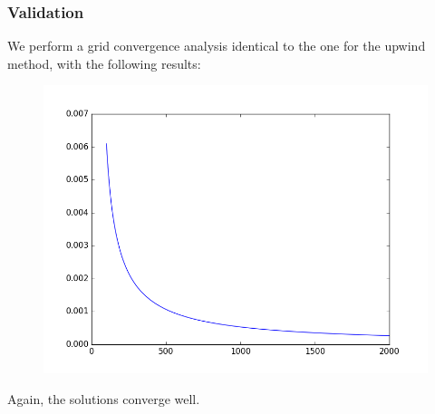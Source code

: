 \documentclass[12pt]{article}
\begin{document}
\subsubsection{Validation}

We perform a grid convergence analysis identical to the one for the upwind method, with the following results:
\begin{figure}[H]
\begin{center}
\includegraphics[width = .85\hsize]{shasta_convergence.png}
\end{center}
\end{figure}
\noindent Again, the solutions converge well.
\end{document}
